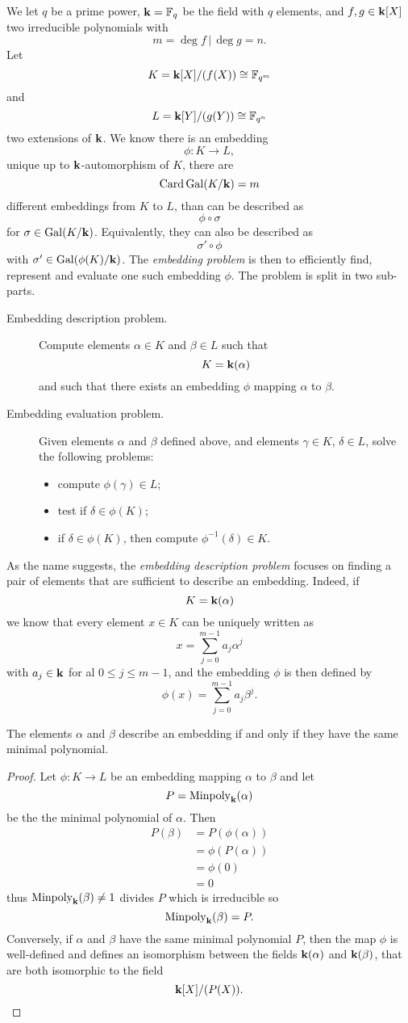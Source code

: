 We let $q$ be a prime power, $\mathbf{k} = \mathbb{F}_q$ be the field with $q$ elements,
and $f, g\in\mathbf{k}[X]$ two irreducible polynomials with
\[
  m=\deg f\,|\,\deg g=n.
\]
Let
\[
  K=\mathbf{k}[X]/(f(X))\cong\mathbb{F}_{q^m}
\]
and
\[
  L = \mathbf{k}[Y]/(g(Y))\cong\mathbb{F}_{q^n}
\]
two extensions of $\mathbf{k}$. We know there is an embedding
\[
  \phi:K\to L,
\]
unique up to $\mathbf{k}$-automorphism of $K$, \ie there are
\[
  \operatorname{Card}\operatorname{Gal}(K/\mathbf{k})=m
\]
different embeddings from $K$ to $L$, than can be described as
\[
  \phi\circ\sigma
\]
for $\sigma\in\operatorname{Gal}(K/\mathbf{k})$. Equivalently, they can also be described as
\[
  \sigma'\circ\phi
\]
with $\sigma'\in\operatorname{Gal}(\phi(K)/\mathbf{k})$. The \emph{embedding problem} is then to
efficiently find, represent and evaluate one such embedding $\phi$. The problem
is split in two sub-parts.
\begin{description}
  \item[Embedding description problem.] Compute elements $\alpha\in K$ and
    $\beta\in L$ such that 
    \[
      K=\mathbf{k}(\alpha)
    \]
    and such that there exists an embedding $\phi$ mapping $\alpha$ to $\beta$.
  \item[Embedding evaluation problem.] Given elements $\alpha$ and $\beta$
    defined above, and elements $\gamma\in K$, $\delta\in L$, solve the
    following problems:
    \begin{itemize}
      \item compute $\phi(\gamma)\in L$;
      \item test if $\delta\in\phi(K)$;
      \item if $\delta\in\phi(K)$, then compute $\phi^{-1}(\delta)\in K$.
    \end{itemize}
\end{description}
As the name suggests, the \emph{embedding description problem} focuses on
finding a pair of elements that are sufficient to describe an embedding. Indeed,
if 
\[
  K=\mathbf{k}(\alpha)
\]
we know that every element $x\in K$ can be uniquely written as 
\[
  x = \sum_{j=0}^{m-1}a_j\alpha^j
\]
with $a_j\in\mathbf{k}$ for al $0\leq j\leq m-1$, and the embedding $\phi$ is then
defined by
\[
  \phi(x) = \sum_{j=0}^{m-1}a_j\beta^j.
\]
\begin{prop}
  \label{prop:description}
 The elements $\alpha$ and $\beta$
 describe an embedding if and only if they have the same minimal polynomial. 
\end{prop}
\begin{proof}
  Let $\phi:K\to L$ be an embedding mapping $\alpha$ to $\beta$ and let 
  \[
    P = \operatorname{Minpoly}_{\mathbf{k}}(\alpha)
  \]
  be the the minimal polynomial of $\alpha$. Then 
  \begin{align*}
    P(\beta) &= P(\phi(\alpha)) \\
    &= \phi(P(\alpha))\\
    &= \phi(0) \\
    &= 0
  \end{align*}
  thus $\operatorname{Minpoly}_{\mathbf{k}}(\beta)\neq 1$ divides $P$ which is irreducible so 
  \[
\operatorname{Minpoly}_{\mathbf{k}}(\beta) = P.
  \]
 Conversely, if $\alpha$ and $\beta$ have the same minimal polynomial $P$, then the
 map $\phi$ is well-defined and defines an isomorphism between the fields $\mathbf{k}(\alpha)$ and
 $\mathbf{k}(\beta)$, that are both isomorphic to the field
 \[
   \mathbf{k}[X]/(P(X)).
 \]
\end{proof}
